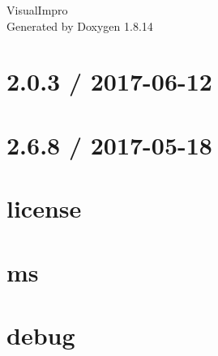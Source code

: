 \documentclass[twoside]{book}
\newcommand{\+}{\discretionary{\mbox{\scriptsize$\hookleftarrow$}}{}{}}
\newcommand{\clearemptydoublepage}{%
  \newpage{\pagestyle{empty}\cleardoublepage}%
}
\begin{document}
\hypersetup{pageanchor=false,
             bookmarksnumbered=true,
             pdfencoding=unicode
            }
\begin{titlepage}
\vspace*{7cm}
\begin{center}%
{\Large Visual\+Impro }\\
\vspace*{1cm}
{\large Generated by Doxygen 1.8.14}\\
\end{center}
\end{titlepage}
\clearemptydoublepage
{}
\tableofcontents
\clearemptydoublepage
{}
\hypersetup{pageanchor=true}

\chapter{2.0.3 / 2017-\/06-\/12}
\label{md_bin_node_modules_socket_8io__history}

\chapter{2.6.8 / 2017-\/05-\/18}
\label{md_bin_node_modules_socket_8io_node_modules_debug__c_h_a_n_g_e_l_o_g}

\chapter{license}
\label{md_bin_node_modules_socket_8io_node_modules_debug_node_modules_ms_license}

\chapter{ms}
\label{md_bin_node_modules_socket_8io_node_modules_debug_node_modules_ms_readme}

\chapter{debug}
\label{md_bin_node_modules_socket_8io_node_modules_debug__r_e_a_d_m_e}

\end{document}
